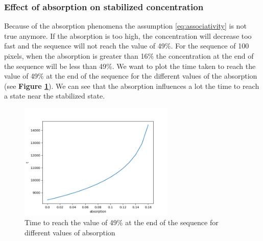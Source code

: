 \subsubsection{Effect of absorption on stabilized concentration}

Because of the absorption phenomena the assumption \eqref{eq:associativity} is not true 
anymore. If the absorption is too high, the concentration will decrease too fast and the 
sequence will not reach the value of 49\%. For the sequence of 100 pixels, when the 
absorption is greater than 16\% the concentration at the end of the sequence will be less 
than 49\%. We want to plot the time taken to reach the value of 49\% at the end of the 
sequence for the different values of the absorption (see \textbf{Figure \ref{fig:absorb}}). We 
can see that the absorption influences a lot the time to reach a state near the stabilized 
state.

\begin{figure}[h]
    \center
    \includegraphics[width=0.66\textwidth]{figures/absorption.png}
    \caption{Time to reach the value of 49\% at the end of the sequence for different values of absorption}
    \label{fig:absorb}
\end{figure}
